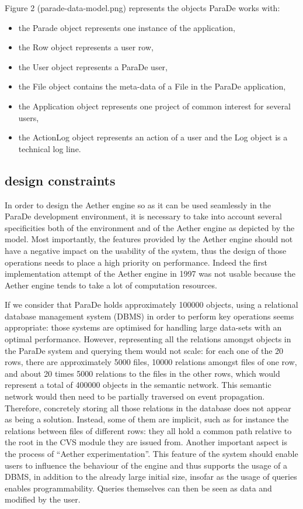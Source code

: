 \documentclass{ecscw2007}
\begin{document}
Figure 2 (parade-data-model.png) represents the objects ParaDe works with:
\begin{itemize}
	\item the Parade object represents one instance of the application,
	\item the Row object represents a user row,
	\item the User object represents a ParaDe user,
	\item the File object contains the meta-data of a File in the ParaDe application,
	\item the Application object represents one project of common interest for several users,
	\item the ActionLog object represents an action of a user and the Log object is a technical log line.
\end{itemize}


\subsection*{design constraints}

In order to design the Aether engine so as it can be used seamlessly in the ParaDe development environment, it is necessary to take into account several specificities both of the environment and of the Aether engine as depicted by the model.
Most importantly, the features provided by the Aether engine should not have a negative impact on the usability of the system, thus the design of those operations needs to place a high priority on performance. Indeed the first implementation attempt of the Aether engine in 1997 was not usable because the Aether engine tends to take a lot of computation resources.

If we consider that ParaDe holds approximately 100000 objects, using a relational database management system (DBMS) in order to perform key operations seems appropriate: those systems are optimised for handling large data-sets with an optimal performance. However, representing all the relations amongst objects in the ParaDe system and querying them would not scale: for each one of the 20 rows, there are approximately 5000 files, 10000 relations amongst files of one row, and about 20 times 5000 relations to the files in the other rows, which would represent a total of 400000 objects in the semantic network. This semantic network would then need to be partially traversed on event propagation. Therefore, concretely storing all those relations in the database does not appear as being a solution. Instead, some of them are implicit, such as for instance the relations between files of different rows: they all hold a common path relative to the root in the CVS module they are issued from.
Another important aspect is the process of “Aether experimentation”. This feature of the system should enable users to influence the behaviour of the engine and thus supports the usage of a DBMS, in addition to the already large initial size, insofar as the usage of queries enables programmability. Queries themselves can then be seen as data and modified by the user.
\end{document}
